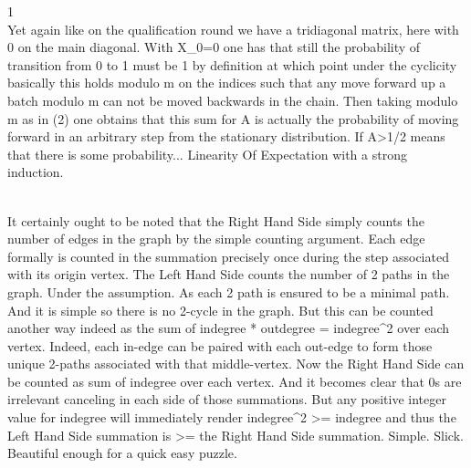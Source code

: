 
1 \\
Yet again like on the qualification round we have a tridiagonal matrix, here with 0 on the main diagonal. With X_0=0 one has that still the probability of transition from 0 to 1 must be 1 by definition at which point under the cyclicity basically this holds modulo m on the indices such that any move forward up a batch modulo m can not be moved backwards in the chain. Then taking modulo m as in (2) one obtains that this sum for A is actually the probability of moving forward in an arbitrary step from the stationary distribution. If A>1/2 means that there is some probability... Linearity Of Expectation with a strong induction.

 \\
It certainly ought to be noted that the Right Hand Side simply counts the number of edges in the graph by the simple counting argument. Each edge formally is counted in the summation precisely once during the step associated with its origin vertex. The Left Hand Side counts the number of 2 paths in the graph. Under the assumption. As each 2 path is ensured to be a minimal path. And it is simple so there is no 2-cycle in the graph. But this can be counted another way indeed as the sum of indegree * outdegree = indegree^2 over each vertex. Indeed, each in-edge can be paired with each out-edge to form those unique 2-paths associated with that middle-vertex. Now the Right Hand Side can be counted as sum of indegree over each vertex. And it becomes clear that 0s are irrelevant canceling in each side of those summations. But any positive integer value for indegree will immediately render indegree^2 >= indegree and thus the Left Hand Side summation is >= the Right Hand Side summation. Simple. Slick. Beautiful enough for a quick easy puzzle.


